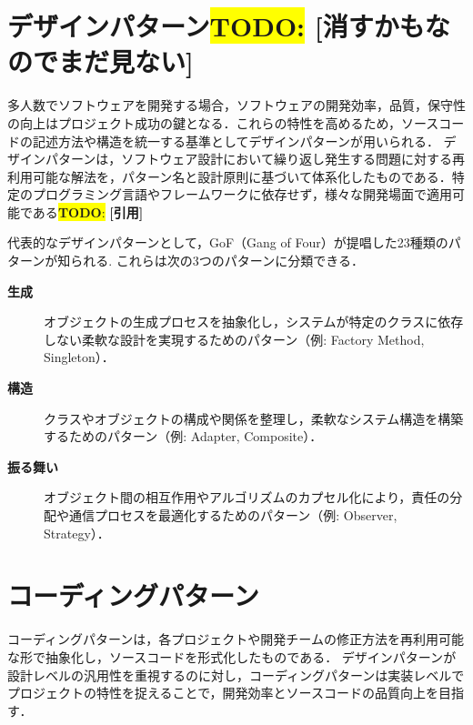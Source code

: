 \documentclass[11pt]{jreport}
\newcommand{\todo}[1]{\colorbox{yellow}{{\bf TODO}:}{\color{red} {\textbf{[#1]}}}}
\begin{document}
\section{デザインパターン\todo{消すかもなのでまだ見ない}}
多人数でソフトウェアを開発する場合，ソフトウェアの開発効率，品質，保守性の向上はプロジェクト成功の鍵となる．これらの特性を高めるため，ソースコードの記述方法や構造を統一する基準としてデザインパターンが用いられる．
デザインパターンは，ソフトウェア設計において繰り返し発生する問題に対する再利用可能な解法を，パターン名と設計原則に基づいて体系化したものである．特定のプログラミング言語やフレームワークに依存せず，様々な開発場面で適用可能である\todo{引用}

代表的なデザインパターンとして，GoF（Gang of Four）が提唱した23種類のパターンが知られる\cite{GoF}.
これらは次の3つのパターンに分類できる．
\begin{description}
    \item[\textbf{生成}] オブジェクトの生成プロセスを抽象化し，システムが特定のクラスに依存しない柔軟な設計を実現するためのパターン（例: Factory Method, Singleton）．
    \item[\textbf{構造}] クラスやオブジェクトの構成や関係を整理し，柔軟なシステム構造を構築するためのパターン（例: Adapter, Composite）．
    \item[\textbf{振る舞い}] オブジェクト間の相互作用やアルゴリズムのカプセル化により，責任の分配や通信プロセスを最適化するためのパターン（例: Observer, Strategy）．
\end{description}
\section{コーディングパターン}
コーディングパターンは，各プロジェクトや開発チームの修正方法を再利用可能な形で抽象化し，ソースコードを形式化したものである．
デザインパターン\cite{GoF}が設計レベルの汎用性を重視するのに対し，コーディングパターンは実装レベルでプロジェクトの特性を捉えることで，開発効率とソースコードの品質向上を目指す．
\end{document}
